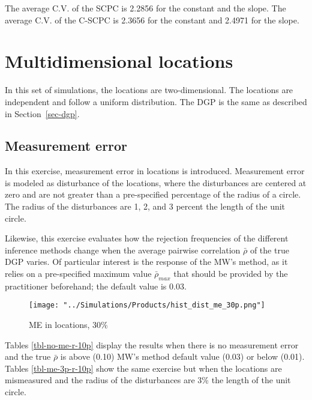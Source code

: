 \documentclass[
]{article}
\begin{document}
The average C.V. of the SCPC is 2.2856 for the constant and the slope.
The average C.V. of the C-SCPC is 2.3656 for the constant and 2.4971 for
the slope.

\hypertarget{sec-multi}{%
\section{Multidimensional locations}\label{sec-multi}}

In this set of simulations, the locations are two-dimensional. The
locations are independent and follow a uniform distribution. The DGP is
the same as described in Section~\ref{sec-dgp}.

\hypertarget{sec-me}{%
\subsection{Measurement error}\label{sec-me}}

In this exercise, measurement error in locations is introduced.
Measurement error is modeled as disturbance of the locations, where the
disturbances are centered at zero and are not greater than a
pre-specified percentage of the radius of a circle. The radius of the
disturbances are 1, 2, and 3 percent the length of the unit circle.

Likewise, this exercise evaluates how the rejection frequencies of the
different inference methods change when the average pairwise correlation
\(\bar\rho\) of the true DGP varies. Of particular interest is the
response of the MW's method, as it relies on a pre-specified maximum
value \(\bar\rho_{max}\) that should be provided by the practitioner
beforehand; the default value is 0.03.

\begin{figure}

{\centering \texttt{[image: "../Simulations/Products/hist\_dist\_me\_30p.png"]}

}

\caption[Histogram of distances using true and mismeasured locations
when ME is 30 percent.]{\label{fig-loc-me}ME in locations, 30\%}

\end{figure}

Tables \ref{tbl-no-me-r-10p} display the results when there is no
measurement error and the true \(\bar\rho\) is above (0.10) MW's method
default value (0.03) or below (0.01). Tables \ref{tbl-me-3p-r-10p} show
the same exercise but when the locations are mismeasured and the radius
of the disturbances are 3\% the length of the unit circle.
\end{document}
